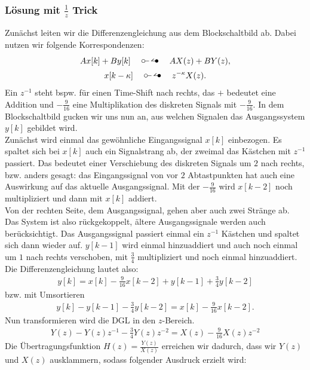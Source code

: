 \documentclass[11pt,a4paper,DIV=12]{scrartcl}
\begin{document}
\subsubsection*{Lösung mit $\frac{1}{z}$ Trick}
Zunächst leiten wir die Differenzengleichung aus dem Blockschaltbild ab. Dabei nutzen wir folgende Korrespondenzen:
\begin{gather}
	Ax[k]+By[k]\quad\ztransf\quad AX(z)+BY(z),\nonumber\\
	x[k-\kappa]\quad\ztransf\quad z^{-\kappa}X(z).\nonumber
\end{gather}
Ein $z^{-1}$ steht bspw. für einen Time-Shift nach rechts, das $+$ bedeutet eine Addition und $-\frac{9}{16}$ eine Multiplikation des diskreten Signals mit $-\frac{9}{16}$. In dem Blockschaltbild gucken wir uns nun an, aus welchen Signalen das Ausgangssystem $y[k]$ gebildet wird.\\
Zunächst wird einmal das gewöhnliche Eingangssignal $x[k]$ einbezogen. Es spaltet sich bei $x[k]$ auch ein Signalstrang ab, der zweimal das Kästchen mit $z^{-1}$ passiert. Das bedeutet einer Verschiebung des diskreten Signals um $2$ nach rechts, bzw. anders gesagt: das Eingangssignal von vor $2$ Abtastpunkten hat auch eine Auswirkung auf das aktuelle Ausgangssignal. Mit der $-\frac{9}{16}$ wird $x[k-2]$ noch multipliziert und dann mit $x[k]$ addiert.\\
Von der rechten Seite, dem Ausgangssignal, gehen aber auch zwei Stränge ab. Das System ist also rückgekoppelt, ältere Ausgangssignale werden auch berücksichtigt. Das Ausgangssignal passiert einmal ein $z^{-1}$ Kästchen und spaltet sich dann wieder auf. $y[k-1]$ wird einmal hinzuaddiert und auch noch einmal um $1$ nach rechts verschoben, mit $\frac{3}{4}$ multipliziert und noch einmal hinzuaddiert. Die Differenzengleichung lautet also: 
\begin{gather}
	y[k] = x[k] - \frac{9}{16} x[k-2] + y[k-1] + \frac{3}{4} y[k-2]
\end{gather}
bzw. mit Umsortieren
\begin{gather}
	y[k] - y[k-1] - \frac{3}{4} y[k-2] = x[k] - \frac{9}{16} x[k-2].
\end{gather}
Nun transformieren wird die DGL in den $z$-Bereich.
\begin{gather}
	Y(z) - Y(z) z^{-1} - \frac{3}{4} Y(z) z^{-2} = X(z) - \frac{9}{16} X(z) z^{-2}
\end{gather}
Die Übertragungsfunktion $H(z)=\frac{Y(z)}{X(z)}$ erreichen wir dadurch, dass wir $Y(z)$ und $X(z)$ ausklammern, sodass folgender Ausdruck erzielt wird:
\end{document}
